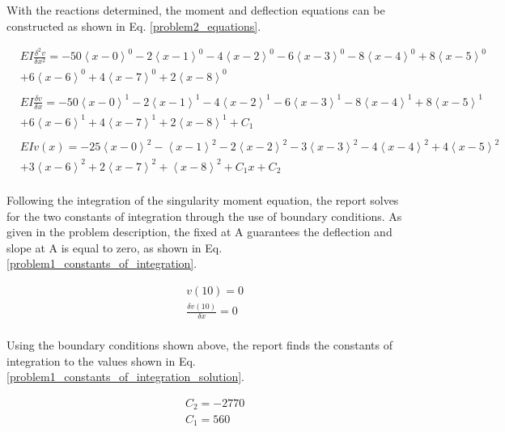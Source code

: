 \documentclass[a4paper]{article}
\begin{document}
With the reactions determined, the moment and deflection equations can be constructed as shown in Eq. \ref{problem2_equations}.

\begin{equation}
    \begin{split}
& EI \frac{\delta^2 v}{\delta x^2} = - 50\left<x-0\right>^0 - 2\left<x-1\right>^0 - 4\left<x-2\right>^0 - 6\left<x-3\right>^0 - 8\left<x-4\right>^0   +  8\left<x-5\right>^0 \\
& + 6\left<x-6\right>^0 +  4\left<x-7\right>^0 + 2\left<x-8\right>^0 \\
& \\
& EI \frac{\delta v}{\delta x} = - 50\left<x-0\right>^1 - 2\left<x-1\right>^1 - 4\left<x-2\right>^1 -  6\left<x-3\right>^1 - 8\left<x-4\right>^1   +  8\left<x-5\right>^1 \\
& + 6\left<x-6\right>^1 +  4\left<x-7\right>^1 + 2\left<x-8\right>^1 + C_1 \\
& \\
& EI v(x) = - 25\left<x-0\right>^2 - \left<x-1\right>^2 - 2\left<x-2\right>^2 -  3\left<x-3\right>^2 - 4\left<x-4\right>^2   +  4\left<x-5\right>^2 \\
& + 3\left<x-6\right>^2  +  2\left<x-7\right>^2 + \left<x-8\right>^2 + C_1 x + C_2 \\
    \end{split}
\label{problem2_equations}
\end{equation}

Following the integration of the singularity moment equation, the report solves for the two constants of integration through the use of boundary conditions. As given in the problem description, the fixed at A guarantees the deflection and slope at A is equal to zero, as shown in Eq. \ref{problem1_constants_of_integration}.

\begin{equation}
\begin{split}
	& v(10) = 0 \\
	& \frac{\delta v(10)}{\delta x} = 0 \\
\end{split}
\label{problem1_constants_of_integration}
\end{equation}

Using the boundary conditions shown above, the report finds the constants of integration to the values shown in Eq. \ref{problem1_constants_of_integration_solution}.

\begin{equation}
\begin{split}
	& C_2 = -2770 \\
	& C_1 = 560 \\
\end{split}
\label{problem1_constants_of_integration_solution}
\end{equation}
\end{document}
